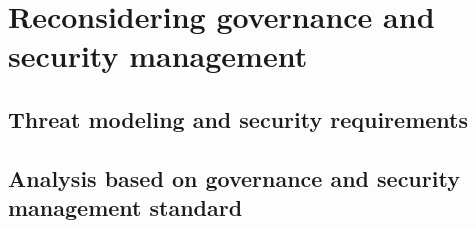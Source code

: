 \section{Reconsidering governance and security management}
\subsection{Threat modeling and security requirements}
\subsection{Analysis based on governance and security management standard}
